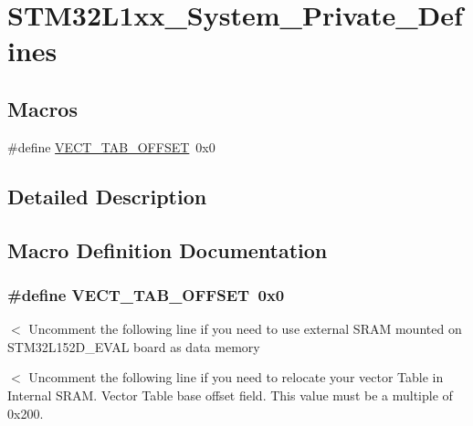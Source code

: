 \hypertarget{group___s_t_m32_l1xx___system___private___defines}{\section{S\-T\-M32\-L1xx\-\_\-\-System\-\_\-\-Private\-\_\-\-Defines}
\label{group___s_t_m32_l1xx___system___private___defines}
}
\subsection*{Macros}
\begin{DoxyCompactItemize}
\item 
\#define \hyperlink{group___s_t_m32_l1xx___system___private___defines_ga40e1495541cbb4acbe3f1819bd87a9fe}{V\-E\-C\-T\-\_\-\-T\-A\-B\-\_\-\-O\-F\-F\-S\-E\-T}~0x0
\end{DoxyCompactItemize}


\subsection{Detailed Description}


\subsection{Macro Definition Documentation}
\hypertarget{group___s_t_m32_l1xx___system___private___defines_ga40e1495541cbb4acbe3f1819bd87a9fe}{
\subsubsection[{V\-E\-C\-T\-\_\-\-T\-A\-B\-\_\-\-O\-F\-F\-S\-E\-T}]{\setlength{\rightskip}{0pt plus 5cm}\#define V\-E\-C\-T\-\_\-\-T\-A\-B\-\_\-\-O\-F\-F\-S\-E\-T~0x0}}\label{group___s_t_m32_l1xx___system___private___defines_ga40e1495541cbb4acbe3f1819bd87a9fe}
$<$ Uncomment the following line if you need to use external S\-R\-A\-M mounted on S\-T\-M32\-L152\-D\-\_\-\-E\-V\-A\-L board as data memory

$<$ Uncomment the following line if you need to relocate your vector Table in Internal S\-R\-A\-M. Vector Table base offset field. This value must be a multiple of 0x200. 